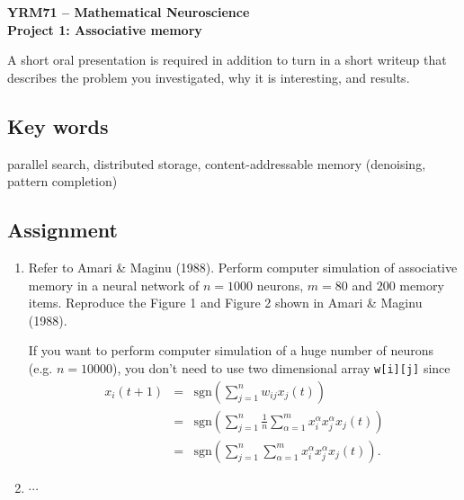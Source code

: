 \documentclass[a4paper,11pt]{jarticle}
\begin{document}
\setlength{\baselineskip}{7mm}
\lfoot{}

\begin{center}
{\large\bf 
YRM71 -- Mathematical Neuroscience\\ Project 1: Associative memory}
\end{center}

A short oral presentation is required
in addition to turn in a short writeup
that describes the problem you investigated, 
why it is interesting, and results. 





\subsection*{Key words}

parallel search, distributed storage, content-addressable memory (denoising,  pattern completion)


\subsection*{Assignment}

\begin{enumerate}
\item  
Refer to Amari \& Maginu (1988).
Perform computer simulation of associative memory
in a neural network of $n=1000$ neurons,
$m=80$ and $200$ memory items.
Reproduce the Figure 1 and Figure 2 shown in Amari \& Maginu (1988).


If you want to perform computer simulation of a huge number of neurons
(e.g. $n=10000$),
you don't need to use two dimensional array {\tt w[i][j]} 
since
\begin{eqnarray}
x_i (t+1) & = & \mathrm{sgn} \left ( \sum_{j=1}^n w_{ij} x_j (t) \right) \nonumber \\
& = &  \mathrm{sgn} \left ( \sum_{j=1}^n  \frac{1}{n} \sum_{\alpha=1}^m x_i^{\alpha} x_j^{\alpha}
  x_j (t) \right ) \nonumber \\
& = &  \mathrm{sgn} \left ( \sum_{j=1}^n  \sum_{\alpha=1}^m x_i^{\alpha} x_j^{\alpha}
  x_j (t) \right ) . \nonumber
\label{eqn:neuron_dynamics}
\end{eqnarray}



\item $ \cdots$
\end{enumerate}
\end{document}
